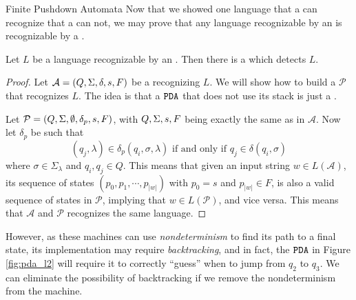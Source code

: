 \begin{section}{Finite Pushdown Automata}
Now that we showed one language that a  can recognize that a
 can not, we may prove that any language recognizable by an
 is recognizable by a .

\begin{theorem}
Let $L$ be a language recognizable by an . Then there is a 
which detects $L$.
\end{theorem}
\begin{proof}
	Let $\mathcal{A} = (Q, \Sigma, \delta, s, F)$ be a  recognizing $L$.
We will show how to build a  $\mathcal{P}$ that recognizes $L$.
The idea is that a $\texttt{PDA}$ that does not use its stack is just a .

Let $\mathcal{P} = (Q, \Sigma, \emptyset, \delta_p, s, F)$, with $Q, \Sigma, s, F$ being
exactly the same as in $\mathcal{A}$. Now let $\delta_p$ be such that
$$(q_j, \lambda) \in \delta_p(q_i, \sigma, \lambda) \text{ if and only if } q_j \in \delta(q_i, \sigma)$$
where $\sigma \in \Sigma_\lambda$ and $q_i, q_j \in Q$. This means that given an
input string $w \in L(\mathcal{A})$, its sequence of states $(p_0, p_1, \cdots, p_{|w|})$
with $p_0 = s$ and $p_{|w|} \in F$, is also a valid sequence of states in $\mathcal{P}$,
implying that $w \in L(\mathcal{P})$, and vice versa. This means that $\mathcal{A}$ and
$\mathcal{P}$ recognizes the same language.
\end{proof}

However, as these machines can use \textit{nondeterminism} to find its path
to a final state, its implementation may require \textit{backtracking},
and in fact, the $\texttt{PDA}$ in Figure \ref{fig:pda_l2} will require it to correctly
``guess'' when to jump from $q_2$ to $q_3$. We can eliminate the possibility
of backtracking if we remove the nondeterminism from the machine.

\end{section}

